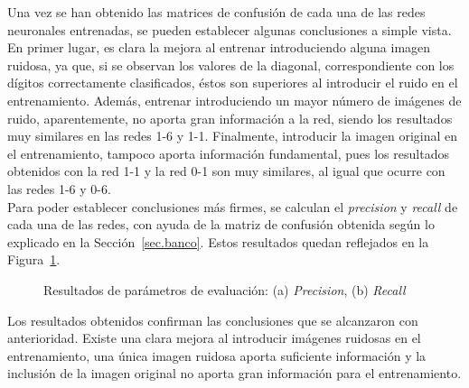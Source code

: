 Una vez se han obtenido las matrices de confusión de cada una de las redes neuronales entrenadas, se pueden establecer algunas conclusiones a simple vista. En primer lugar, es clara la mejora al entrenar introduciendo alguna imagen ruidosa, ya que, si se observan los valores de la diagonal, correspondiente con los dígitos correctamente clasificados, éstos son superiores al introducir el ruido en el entrenamiento. Además, entrenar introduciendo un mayor número de imágenes de ruido, aparentemente, no aporta gran información a la red, siendo los resultados muy similares en las redes 1-6 y 1-1. Finalmente, introducir la imagen original en el entrenamiento, tampoco aporta información fundamental, pues los resultados obtenidos con la red 1-1 y la red 0-1 son muy similares, al igual que ocurre con las redes 1-6 y 0-6.\\

Para poder establecer conclusiones más firmes, se calculan el \textit{precision} y \textit{recall} de cada una de las redes, con ayuda de la matriz de confusión obtenida según lo explicado en la Sección~\ref{sec.banco}. Estos resultados quedan reflejados en la Figura~\ref{fig.precision-recall}.
\begin{figure}[H]
	\centering
	\caption{Resultados de parámetros de evaluación: (a) \textit{Precision}, (b) \textit{Recall}}
		\label{fig.precision-recall}
\end{figure}
Los resultados obtenidos confirman las conclusiones que se alcanzaron con anterioridad. Existe una clara mejora al introducir imágenes ruidosas en el entrenamiento, una única imagen ruidosa aporta suficiente información y la inclusión de la imagen original no aporta gran información para el entrenamiento.\\

